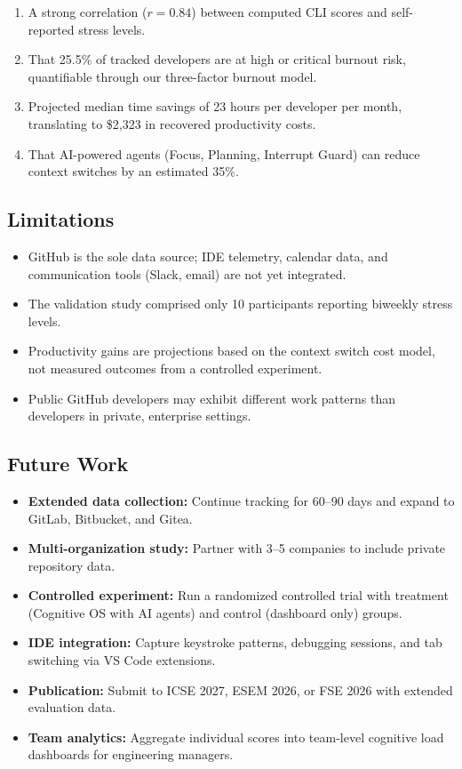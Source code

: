 \documentclass[12pt]{article}
\begin{document}
\begin{enumerate}[noitemsep]
    \item A strong correlation ($r = 0.84$) between computed CLI scores and self-reported stress levels.
    \item That 25.5\% of tracked developers are at high or critical burnout risk, quantifiable through our three-factor burnout model.
    \item Projected median time savings of 23 hours per developer per month, translating to \$2,323 in recovered productivity costs.
    \item That AI-powered agents (Focus, Planning, Interrupt Guard) can reduce context switches by an estimated 35\%.
\end{enumerate}

\subsection{Limitations}

\begin{itemize}[noitemsep]
    \item GitHub is the sole data source; IDE telemetry, calendar data, and communication tools (Slack, email) are not yet integrated.
    \item The validation study comprised only 10 participants reporting biweekly stress levels.
    \item Productivity gains are projections based on the context switch cost model, not measured outcomes from a controlled experiment.
    \item Public GitHub developers may exhibit different work patterns than developers in private, enterprise settings.
\end{itemize}

\subsection{Future Work}

\begin{itemize}[noitemsep]
    \item \textbf{Extended data collection:} Continue tracking for 60--90 days and expand to GitLab, Bitbucket, and Gitea.
    \item \textbf{Multi-organization study:} Partner with 3--5 companies to include private repository data.
    \item \textbf{Controlled experiment:} Run a randomized controlled trial with treatment (Cognitive OS with AI agents) and control (dashboard only) groups.
    \item \textbf{IDE integration:} Capture keystroke patterns, debugging sessions, and tab switching via VS Code extensions.
    \item \textbf{Publication:} Submit to ICSE 2027, ESEM 2026, or FSE 2026 with extended evaluation data.
    \item \textbf{Team analytics:} Aggregate individual scores into team-level cognitive load dashboards for engineering managers.
\end{itemize}

\newpage


\end{document}

